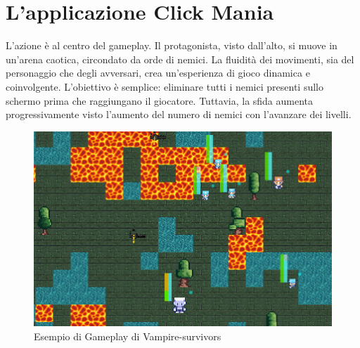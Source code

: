 \documentclass[12pt,a4paper]{report}
\begin{document}
\chapter{L'applicazione Click Mania}\label{se:appjgal}
L'azione è al centro del gameplay. Il protagonista, visto dall'alto, si muove in un'arena caotica, circondato da orde di nemici.
La fluidità dei movimenti, sia del personaggio che degli avversari, crea un'esperienza di gioco dinamica e coinvolgente.
L'obiettivo è semplice: eliminare tutti i nemici presenti sullo schermo prima che raggiungano il giocatore.
Tuttavia, la sfida aumenta progressivamente visto l'aumento del numero di nemici con l'avanzare dei livelli.\\
\begin{figure}[h]
    \centering
    \includegraphics[width=1\textwidth]{cmgp}
    \caption{Esempio di Gameplay di Vampire-survivors}
    \label{fig:enter-label}
\end{figure}

\newpage
\end{document}
